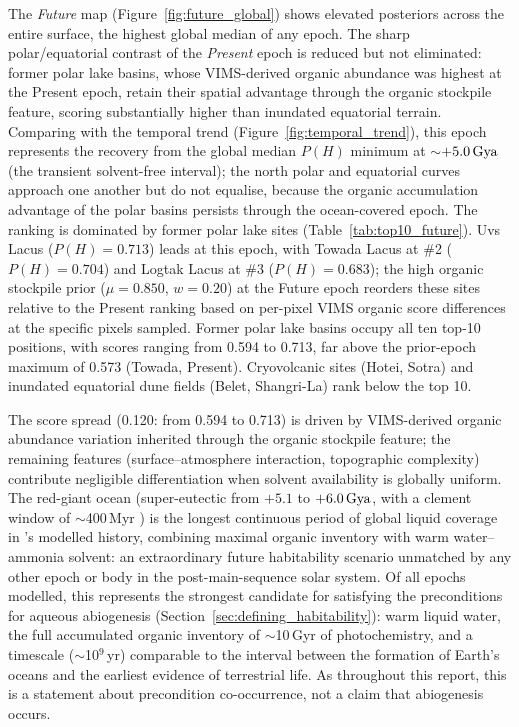 The \textit{Future} map (Figure~\ref{fig:future_global}) shows elevated posteriors across the entire surface, the highest global median of any epoch.  The sharp polar/equatorial contrast of the \textit{Present} epoch is reduced but not eliminated: former polar lake basins, whose VIMS-derived organic abundance was highest at the Present epoch, retain their spatial advantage through the organic stockpile feature, scoring substantially higher than inundated equatorial terrain.  Comparing with the temporal trend (Figure~\ref{fig:temporal_trend}), this epoch represents the recovery from the global median $P(H)$ minimum at $\sim$$+5.0\,\text{Gya}$ (the transient solvent-free interval); the north polar and equatorial curves approach one another but do not equalise, because the organic accumulation advantage of the polar basins persists through the ocean-covered epoch.  The ranking is dominated by former polar lake sites (Table~\ref{tab:top10_future}).  Uvs Lacus ($P(H){=}0.713$) leads at this epoch, with Towada Lacus at \#2 ($P(H){=}0.704$) and Logtak Lacus at \#3 ($P(H){=}0.683$); the high organic stockpile prior ($\mu=0.850$, $w=0.20$) at the Future epoch reorders these sites relative to the Present ranking based on per-pixel VIMS organic score differences at the specific pixels sampled.  Former polar lake basins occupy all ten top-10 positions, with scores ranging from 0.594 to 0.713, far above the prior-epoch maximum of 0.573 (Towada, Present).  Cryovolcanic sites (Hotei, Sotra) and inundated equatorial dune fields (Belet, Shangri-La) rank below the top 10.

The score spread (0.120: from 0.594 to 0.713) is driven by VIMS-derived organic abundance variation inherited through the organic stockpile feature; the remaining features (surface--atmosphere interaction, topographic complexity) contribute negligible differentiation when solvent availability is globally uniform.  The red-giant ocean (super-eutectic from $+5.1$ to $+6.0\,\text{Gya}$, with a clement window of $\sim$400\,Myr \citep{Lorenz1997}) is the longest continuous period of global liquid coverage in \titan{}'s modelled history, combining maximal organic inventory with warm water--ammonia solvent: an extraordinary future habitability scenario unmatched by any other epoch or body in the post-main-sequence solar system.  Of all epochs modelled, this represents the strongest candidate for satisfying the preconditions for aqueous abiogenesis (Section~\ref{sec:defining_habitability}): warm liquid water, the full accumulated organic inventory of $\sim$10\,Gyr of photochemistry, and a timescale ($\sim$10$^9$\,yr) comparable to the interval between the formation of Earth's oceans and the earliest evidence of terrestrial life.  As throughout this report, this is a statement about precondition co-occurrence, not a claim that abiogenesis occurs.

